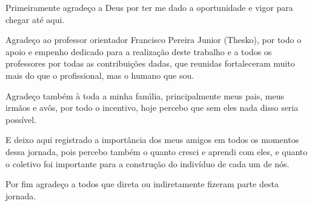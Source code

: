 
\begin{agradecimentos}[AGRADECIMENTOS]

Primeiramente agradeço a Deus por ter me dado a oportunidade e vigor para chegar até aqui.

Agradeço ao professor orientador Francisco Pereira Junior (Thesko), por todo o apoio e empenho dedicado para a realização deste trabalho e a todos os professores por todas as contribuições dadas, que reunidas fortaleceram muito mais do que o profissional, mas o humano que sou.

Agradeço também à toda a minha famı́lia, principalmente meus pais, meus irmãos e avôs, por todo o incentivo, hoje percebo que sem eles nada disso seria possível. 

E deixo aqui registrado a importância dos meus amigos em todos os momentos dessa jornada, pois percebo também o quanto cresci e aprendi com eles, e quanto o coletivo foi importante para a construção do indivíduo de cada um de nós.

Por fim agradeço a todos que direta ou indiretamente fizeram parte desta jornada.

\end{agradecimentos}
